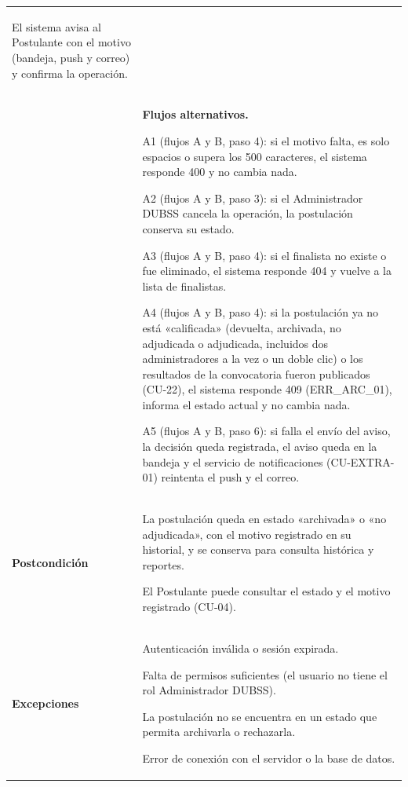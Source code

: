 \begin{longtable}{>{\raggedright\arraybackslash}p{2.9cm} >{\raggedright\arraybackslash}p{12.6cm}}
\begin{cupasos}
    \item El sistema avisa al Postulante con el motivo (bandeja, push y correo) y confirma la operación.
\end{cupasos} \\
 & \textbf{Flujos alternativos.}
\begin{cuvin}
    \item A1 (flujos A y B, paso 4): si el motivo falta, es solo espacios o supera los 500 caracteres, el sistema responde 400 y no cambia nada.
    \item A2 (flujos A y B, paso 3): si el Administrador DUBSS cancela la operación, la postulación conserva su estado.
    \item A3 (flujos A y B, paso 4): si el finalista no existe o fue eliminado, el sistema responde 404 y vuelve a la lista de finalistas.
    \item A4 (flujos A y B, paso 4): si la postulación ya no está «calificada» (devuelta, archivada, no adjudicada o adjudicada, incluidos dos administradores a la vez o un doble clic) o los resultados de la convocatoria fueron publicados (CU-22), el sistema responde 409 (ERR\_ARC\_01), informa el estado actual y no cambia nada.
    \item A5 (flujos A y B, paso 6): si falla el envío del aviso, la decisión queda registrada, el aviso queda en la bandeja y el servicio de notificaciones (CU-EXTRA-01) reintenta el push y el correo.
\end{cuvin} \\
\midrule
\textbf{Postcondición} & \vspace{-\baselineskip}\begin{cuvin}
    \item La postulación queda en estado «archivada» o «no adjudicada», con el motivo registrado en su historial, y se conserva para consulta histórica y reportes.
    \item El Postulante puede consultar el estado y el motivo registrado (CU-04).
\end{cuvin} \\
\midrule
\textbf{Excepciones} & \vspace{-\baselineskip}\begin{cuvin}
    \item Autenticación inválida o sesión expirada.
    \item Falta de permisos suficientes (el usuario no tiene el rol Administrador DUBSS).
    \item La postulación no se encuentra en un estado que permita archivarla o rechazarla.
    \item Error de conexión con el servidor o la base de datos.
\end{cuvin} \\
\end{longtable}
\endgroup
\addtocounter{table}{-1}

